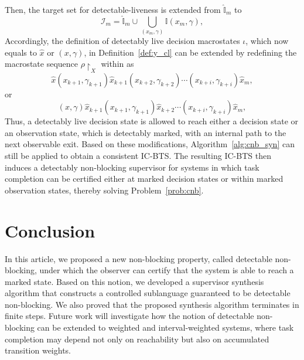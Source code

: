 \documentclass[twocolumn]{autart}
\begin{document}
Then, the target set for detectable-liveness is extended from
$\hat{\mathbb{I}}_m$ to
\begin{equation}\label{eq:extended_target_set}
\mathcal{I}_m
= \hat{\mathbb{I}}_m \cup \bigcup_{(x_m, \gamma)} \mathbb{I}(x_m,\gamma),
\end{equation}
Accordingly, the definition of detectably live decision macrostates $\iota$, which now equals to $\hat{x}$ or $(x, \gamma)$, in Definition~\ref{def:y_cl} can be extended by redefining the macrostate sequence $\rho\restriction_{X}$ within as
\begin{equation}\label{eq:bcc_y_cl:2}
    \hat{x} (x_{k+1}, \gamma_{k+1}) \hat{x}_{k+1} (x_{k+2}, \gamma_{k+2}) \cdots (x_{k+i}, \gamma_{k+i}) \hat{x}_m,    
\end{equation}
or
\begin{equation}\label{eq:bcc_y_cl:3}
    (x, \gamma) \hat{x}_{k+1} (x_{k+1}, \gamma_{k+1}) \hat{x}_{k+2} \cdots (x_{k+i}, \gamma_{k+i}) \hat{x}_m,    
\end{equation}
Thus, a detectably live decision state is allowed to reach either a decision state or an observation state, which is detectably marked, with an internal path to the next observable exit.
%
Based on these modifications, Algorithm~\ref{alg:cnb_syn} can still be applied to obtain a consistent IC-BTS. 
The resulting IC-BTS then induces a detectably non-blocking supervisor for systems in which task completion can be certified either at marked decision states or within marked observation states, thereby solving Problem~\ref{prob:cnb}.




\section{Conclusion}\label{sec:con}
%
In this article, we proposed a new non-blocking property, called detectable non-blocking, under which the observer can certify that the system is able to reach a marked state. 
Based on this notion, we developed a supervisor synthesis algorithm that constructs a controlled sublanguage guaranteed to be detectable non-blocking. 
We also proved that the proposed synthesis algorithm terminates in finite steps. 
%
Future work will investigate how the notion of detectable non-blocking can be extended to weighted and interval-weighted systems, where task completion may depend not only on reachability but also on accumulated transition weights.




\end{document}
